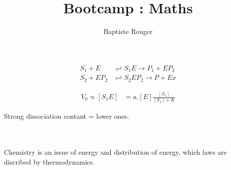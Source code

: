 \documentclass{article}
\title{Bootcamp : Maths}
\author{Baptiste Rouger}
\begin{document}
    \maketitle

    \tableofcontents

    \newpage

\begin{align*}
    S_1 + E &\rightleftharpoons  S_1E \rightarrow P_1 + EP_2 \\
    S_2 + EP_2 &\rightleftharpoons S_2EP_2 \rightarrow P + Ex
\end{align*}

\begin{align*}
    V_0 \propto [S_1E] &= a.[E]\frac{[S_1]}{[S_1]+K}
\end{align*}

Strong dissociation contant = lower ones.

~\\~\\

Chemistry is an issue of energy and distribution of energy, which laws are discribed by thermodynamics.
\end{document}
